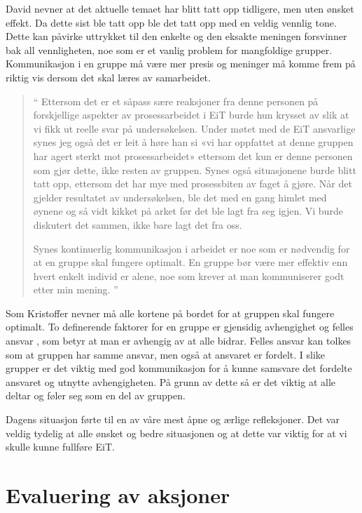 David nevner at det aktuelle temaet har blitt tatt opp tidligere, men uten ønsket effekt. Da dette sist ble tatt opp ble
det tatt opp med en veldig vennlig tone. Dette kan påvirke uttrykket til den enkelte og den eksakte meningen 
forsvinner bak all vennligheten, noe som er et vanlig problem for mangfoldige grupper. \cite{Artikkel2} 
Kommunikasjon i en gruppe må være mer presis og meninger må komme frem på
riktig vis dersom det skal læres av samarbeidet.  

\begin{quote}``
Ettersom det er et såpass sære reaksjoner fra denne personen på 
forskjellige aspekter av prosessarbeidet i EiT burde hun krysset av slik at vi fikk ut reelle svar på undersøkelsen. 
Under møtet med de EiT ansvarlige synes jeg også det er leit å høre han si «vi har oppfattet at denne gruppen har agert 
sterkt mot prosessarbeidet» ettersom det kun er denne personen som gjør dette, ikke resten av gruppen. Synes 
også situasjonene burde blitt tatt opp, ettersom det har mye med prosessbiten av faget å gjøre. Når det gjelder 
resultatet av undersøkelsen, ble det med en gang himlet med øynene og så vidt kikket på arket før det ble lagt fra 
seg igjen. Vi burde diskutert det sammen, ikke bare lagt det fra oss.

Synes kontinuerlig kommunikasjon i arbeidet er noe som er nødvendig for at en gruppe skal fungere optimalt. En 
gruppe bør være mer effektiv enn hvert enkelt individ er alene, noe som krever at man kommuniserer godt etter min 
mening.
''\end{quote} 

Som Kristoffer nevner må alle kortene på bordet for at gruppen skal fungere optimalt. To definerende faktorer
for en gruppe er gjensidig avhengighet og felles ansvar \cite{Artikkel4}, som betyr at man er avhengig av at
alle bidrar. Felles ansvar kan tolkes som at gruppen har samme ansvar, men også at ansvaret er fordelt. I slike 
grupper er det viktig med god kommunikasjon for å kunne samsvare det fordelte ansvaret og utnytte avhengigheten.
På grunn av dette så er det viktig at alle deltar og føler seg som en del av gruppen.

Dagens situasjon førte til en av våre mest åpne og ærlige refleksjoner. Det var veldig tydelig at
alle ønsket og bedre situasjonen og at dette var viktig for at vi skulle kunne fullføre EiT. 

\section{Evaluering av aksjoner}

